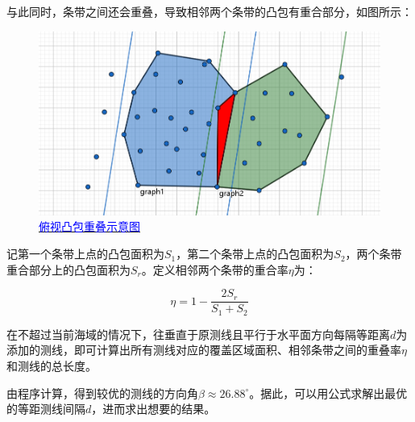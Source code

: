 与此同时，条带之间还会重叠，导致相邻两个条带的凸包有重合部分，如图所示：

\begin{figure}[h]   
    \centering
    \includegraphics[scale=0.3]{res/img/俯视凸包重叠示意图.png}
    \caption{\href{https://www.geogebra.org/m/sf4pvazp}{\textcolor{blue}{俯视凸包重叠示意图}}}
    \label{fig:俯视凸包重叠示意图}
\end{figure}

记第一个条带上点的凸包面积为$S_1$，第二个条带上点的凸包面积为$S_2$，两个条带重合部分上的凸包面积为$S_r$。定义相邻两个条带的重合率$\eta$为：

\begin{equation}
    \eta = 1 - \frac{2 S_r}{S_1 + S_2}
\end{equation}

在不超过当前海域的情况下，往垂直于原测线且平行于水平面方向每隔等距离$d$为添加的测线，即可计算出所有测线对应的覆盖区域面积、相邻条带之间的重叠率$\eta$和测线的总长度。

由程序计算，得到较优的测线的方向角$\beta \approx 26.88 ^{\circ} $。据此，可以用公式求解出最优的等距测线间隔$d$，进而求出想要的结果。



\mcmSubsection{}